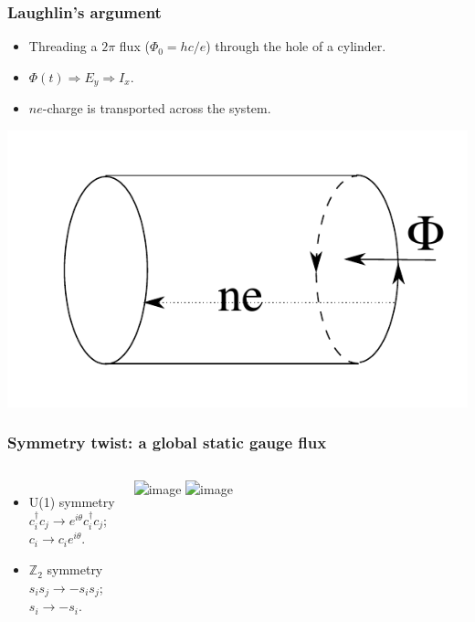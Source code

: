 \documentclass[xcolor=table, aspectratio=43,ignorenonframetext]{beamer}
\begin{document}
\begin{frame}
	\frametitle{Laughlin's argument}
	\begin{itemize}
		\item Threading a $2\pi$ flux ($\Phi_0 = hc/e$) through the hole of a cylinder.
		\item $\Phi(t)\Rightarrow E_y\Rightarrow I_x$.
		\item $ne$-charge is transported across the system.
	\end{itemize}
	\includegraphics{../spt-lecture/laughlin}
\end{frame}

\begin{frame}
	\frametitle{Symmetry twist: a global static gauge flux}
	\begin{columns}
		\begin{itemize}
			\item U(1) symmetry\\
			$c_i^\dagger c_j\rightarrow e^{i\theta}c_i^\dagger c_j$;\\
			$c_i\rightarrow c_ie^{i\theta}$.
			\item $\mathbb Z_2$ symmetry\\
			$s_is_j\rightarrow-s_is_j$;\\
			$s_i\rightarrow -s_i$.
		\end{itemize}
		\includegraphics<1>{../spt-lecture/sym-twist}
		\includegraphics<2>{../spt-lecture/sym-gauge}
	\end{columns}
\end{frame}
\end{document}
